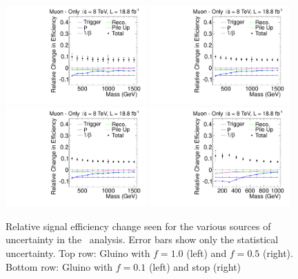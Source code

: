 \begin{figure}[ht]
\centering
  \includegraphics[clip=false, trim=0.0cm 0cm 0.0cm 0cm, width=0.48\textwidth]{figures/muonly/MoGluino_f100Uncertainty}
  \includegraphics[clip=false, trim=0.0cm 0cm 0.0cm 0cm, width=0.48\textwidth]{figures/muonly/MoGluino_f50Uncertainty} \\
  \includegraphics[clip=false, trim=0.0cm 0cm 0.0cm 0cm, width=0.48\textwidth]{figures/muonly/MoGluino_f10Uncertainty}
  \includegraphics[clip=false, trim=0.0cm 0cm 0.0cm 0cm, width=0.48\textwidth]{figures/muonly/MoStopUncertainty}
\caption[Relative signal efficiency change seen for the various sources of uncertainty in the \muononly\ analysis]
{Relative signal efficiency change seen for the various sources of uncertainty in the \muononly\ analysis.
Error bars show only the statistical uncertainty.
Top row: Gluino with $f=1.0$ (left) and $f=0.5$ (right).
Bottom row: Gluino with $f=0.1$ (left) and stop (right)}
    \label{fig:MuOnlyUncSource}
\end{figure}

